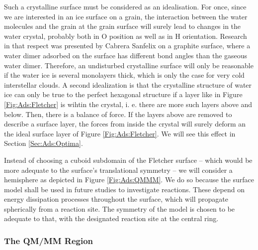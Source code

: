 \documentclass[8.5pt,twoside,twocolumn]{article}
\theoremstyle{standard}
\begin{document}
Such a crystalline surface must be considered as an idealisation. For once,
since we are interested in an ice surface on a grain, the interaction between
the water molecules and the grain at the grain surface will surely lead to
changes in the water crystal, probably both in O position as well as in H
orientation.
Research in that respect was presented by Cabrera Sanfelix
\etal\cite{CabreraSanfelix2003} on a graphite surface, where a water dimer
adsorbed on the surface has different bond angles than the gaseous water dimer.
Therefore, an undisturbed crystalline surface will only be reasonable if the
water ice is several monolayers thick, which is only the case for very cold
interstellar clouds. A second idealization is that the crystalline structure of
water ice can only be true to the perfect hexagonal structure if a layer like
in Figure \ref{Fig:Ads:Fletcher} is wihtin the crystal, i. e. there are more
such layers above and below. Then, there is a balance of force. If the layers
above are removed to describe a surface layer, the forces from inside the
crystal will surely deform an the ideal surface layer of Figure
\ref{Fig:Ads:Fletcher}.
We will see this effect in Section \ref{Sec:Ads:Optima}.

Instead of choosing a cuboid subdomain of the Fletcher surface -- which would be more adequate
to the surface's translational symmetry -- we will consider a hemisphere as depicted in Figure
\ref{Fig:Ads:QMMM}. We do so because the surface model shall be used in future studies
to investigate reactions. These depend on energy dissipation processes throughout the
surface, which will propagate spherically from a reaction site. The symmetry of the model
is chosen to be adequate to that, with the designated reaction site at the
central ring.

\subsubsection{The QM/MM Region}
\label{Sec:Ads:QM/MM}
\end{document}
